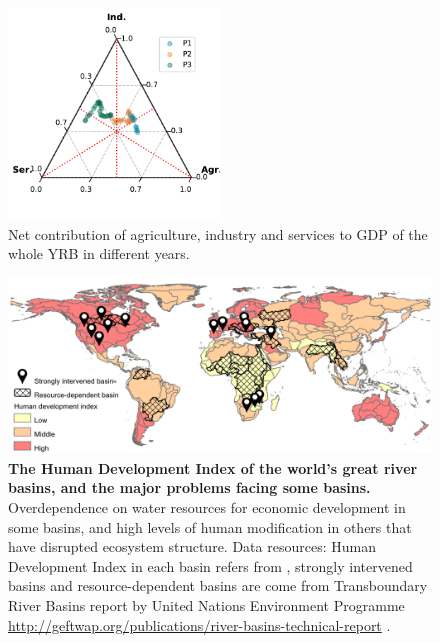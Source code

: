 \documentclass[9pt,twoside,lineno]{pnas-new}
\begin{document}
\begin{figure}
    \centering
    \includegraphics[width=0.5\textwidth]{../../figures/sup/ternary.pdf}
    \caption{Net contribution of agriculture, industry and services to GDP of the whole YRB in different years.}
\end{figure}





\begin{figure}%
	\centering
	\includegraphics[width=\linewidth]{../../figures/main/map.pdf}
	\caption{
		\textbf{The Human Development Index of the world's great river basins, and the major problems facing some basins.}
		Overdependence on water resources for economic development in some basins, and high levels of human modification in others that have disrupted ecosystem structure. Data resources: Human Development Index in each basin refers from \cite{linkeGlobalHydroenvironmentalSubbasin2019}, strongly intervened basins and resource-dependent basins are come from Transboundary River Basins report by United Nations Environment Programme \url{http://geftwap.org/publications/river-basins-technical-report} \cite{unep-dhiTransboundaryRiverBasins2016}.
	}
	\label{fig:traps}
\end{figure}
\end{document}

